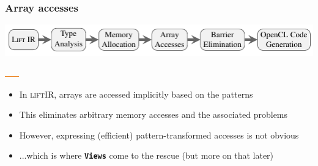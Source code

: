 \documentclass[10pt]{beamer}
\newcommand{\lift}{\textsc{lift}\space}
\newcommand{\code}[1]{\textbf{\texttt{#1}}}
\begin{document}
\begin{frame}[t]
\frametitle{Array accesses}
    \vspace{-1cm}
    \begin{block}{}
        \begin{center}
            \includegraphics[width=1\textwidth]{../images/compilation_stages.pdf}
        \end{center}
        \vspace{-1.05cm}
        \hspace{5.2cm}
        \includegraphics[width=.95cm, height=0.03cm]{../images/orange_bar.png}
        \vspace{.45cm}
    \end{block}
    \vspace{-0.5cm}
\begin{itemize}
	\item In \lift IR, arrays are accessed implicitly based on the patterns
	\item This eliminates arbitrary memory accesses and the associated problems
	\item However, expressing (efficient) pattern-transformed accesses is not obvious
	\item ...which is where \code{Views} come to the rescue (but more on that later)
\end{itemize}
\end{frame}
\end{document}
